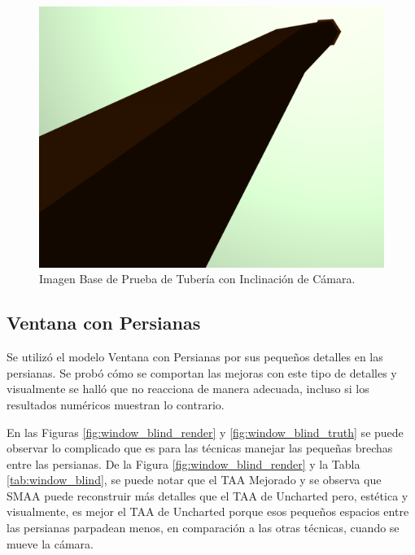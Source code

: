 \documentclass[pregrado]{tesis-usb} %
\begin{document}
\begin{figure}[!htb]
	\centering
	\includegraphics[scale=0.2]{images/results/pipe_with_inclination_sobel_ground_truth.png}
	\caption{Imagen Base de Prueba de Tubería con Inclinación de Cámara.}\label{fig:pipe_inclination_truth}
\end{figure}

\FloatBarrier

\subsection{Ventana con Persianas}
Se utilizó el modelo Ventana con Persianas por sus pequeños detalles en las persianas. Se probó cómo se comportan las mejoras con este tipo de detalles y visualmente se halló que no reacciona de manera adecuada, incluso si los resultados numéricos muestran lo contrario. 

En las Figuras \ref{fig:window_blind_render} y \ref{fig:window_blind_truth} se puede observar lo complicado que es para las técnicas manejar las pequeñas brechas entre las persianas. De la Figura \ref{fig:window_blind_render} y la Tabla \ref{tab:window_blind}, se puede notar que el TAA Mejorado y se observa que SMAA puede reconstruir más detalles que el TAA de Uncharted pero, estética y visualmente, es mejor el TAA de Uncharted porque esos pequeños espacios entre las persianas parpadean menos, en comparación a las otras técnicas, cuando se mueve la cámara.
\end{document}
